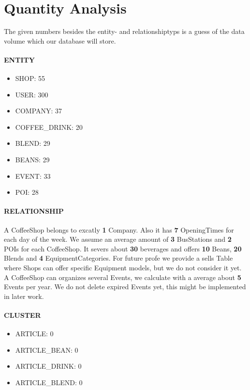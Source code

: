 \section{Quantity Analysis}
The given numbers besides the entity- and relationshiptyps is a guess of the data volume which our database will store.
\paragraph{ENTITY}
\begin{itemize}
\item SHOP: 55
\item USER: 300
\item COMPANY: 37
\item COFFEE\_DRINK: 20
\item BLEND: 29
\item BEANS: 29
\item EVENT: 33
\item POI: 28
\end{itemize}



\paragraph{RELATIONSHIP}
A CoffeeShop belongs to excatly \textbf{1} Company. Also it has \textbf{7} OpeningTimes for each day of the week. We assume an average amount of \textbf{3} BusStations and \textbf{2} POIs for each CoffeeShop. It severs about \textbf{30} beverages and offers \textbf{10} Beans, \textbf{20} Blends and \textbf{4} EquipmentCategories. For future profe we provide a sells Table where Shops can offer specific Equipment models, but we do not consider it yet.\\
A CoffeeShop can organizes several Events, we calculate with a average about \textbf{5} Events per year. We do not delete expired Events yet, this might be implemented in later work.
 


\paragraph{CLUSTER}
\begin{itemize}
\item ARTICLE: 0
\item ARTICLE\_BEAN: 0
\item ARTICLE\_DRINK: 0
\item ARTICLE\_BLEND: 0
\end{itemize}

